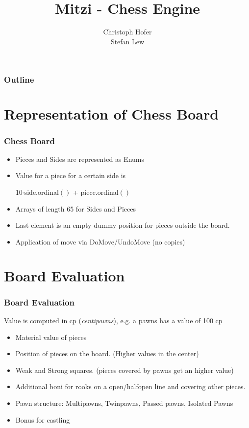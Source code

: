 \documentclass [12pt ,a4paper, british]{beamer}
\author{Christoph Hofer \\ Stefan Lew}
\title{Mitzi - Chess Engine}
\theoremstyle{plain}
\theoremstyle{definition}
\begin{document}
	\begin{frame}
		\maketitle
	\end{frame}
	
	\begin{frame}
		\frametitle{Outline}
    \small
    \tableofcontents
	\end{frame}

	\section{Representation of Chess Board}
	\begin{frame}
		\frametitle{Chess Board}
		\begin{itemize}
			\item Pieces and Sides are represented as Enums
			\item Value for a piece for a certain side is
				\begin{center}
					10$\cdot$side.ordinal$()$ + piece.ordinal$()$
				\end{center}
			\item Arrays of length 65 for Sides and Pieces 
			\item Last element is an empty dummy position for pieces outside the board.
			\item Application of move via DoMove/UndoMove (no copies)
		\end{itemize}
	\end{frame}
	
	\section{Board Evaluation}
	\begin{frame}
		\frametitle{Board Evaluation}
		Value is computed in cp (\emph{centipawns}), e.g. a pawns has a value of 100 cp
		\begin{itemize}
			\item Material value of pieces
			\item Position of pieces on the board. (Higher values in the center)
			\item Weak and Strong squares. (pieces covered by pawns get an higher value)
			\item Additional boni for rooks on a open/halfopen line and covering other pieces.
			\item Pawn structure: Multipawns, Twinpawns, Passed pawns, Isolated Pawns
			\item Bonus for castling
		\end{itemize}
	\end{frame}
\end{document}

